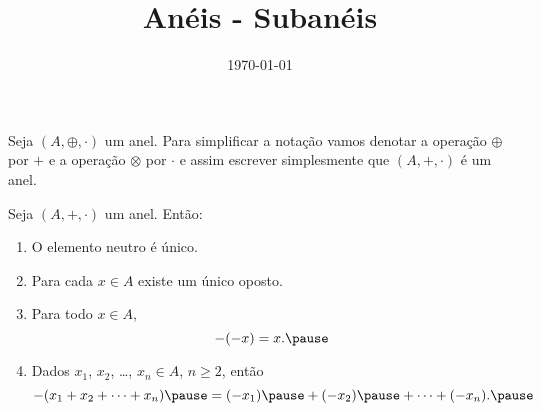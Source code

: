 \documentclass{beamer}
\title{Anéis - Subanéis}
\author[\autor]{\autor}
\institute[\instituto]{\instituto}
\date{\today}
\begin{document}
    \begin{frame}
        \maketitle
    \end{frame}

    
    \begin{frame}
        \begin{observacao}
            Seja $(A, \oplus, \cdot)$ \pause um anel. \pause Para simplificar a nota\c{c}\~ao \pause vamos denotar a opera\c{c}\~ao $\oplus$ \pause por $+$ \pause e a opera\c{c}\~ao $\otimes$ \pause por $\cdot$ \pause e assim escrever simplesmente \pause que $(A, +, \cdot)$ \pause \'e um anel.\pause
        \end{observacao}
    \end{frame}

    \begin{frame}
        \begin{proposicao}
            Seja $(A, + , \cdot)$ um anel. \pause Ent\~ao:\pause
            \begin{enumerate}[label={\roman*})]
                \item O elemento neutro {\'e} {\'u}nico.\pause

                \vspace{.5cm}

                \item Para cada $x \in A$ \pause existe um {\'u}nico oposto.\pause

                \vspace{.5cm}
                
                \item Para todo $x \in A$, \pause
                \[
                    -(-x) = x.\pause
                \]

                \vspace{.5cm}
                
                \item Dados $x_{1}$, \pause $x_{2}$, \pause \dots, $x_n \in A$, \pause $n \geqslant 2$, \pause ent{\~a}o\pause
                \[
                    -(x_1 + x_2 + \dots + x_n) \pause = (-x_1) \pause + (-x_2) \pause + \dots + (-x_n).\pause
                \]

                \vspace{.2cm}

                \seti
            \end{enumerate}
        \end{proposicao}
    \end{frame}
\end{document}
